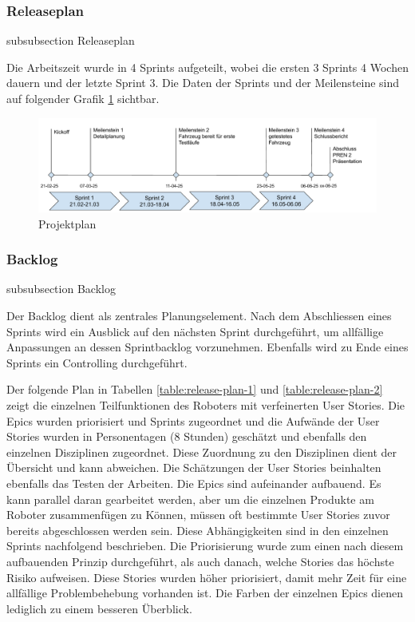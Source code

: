 \subsubsection*{Releaseplan}
    {subsubsection}
    {Releaseplan}

Die Arbeitszeit wurde in 4 Sprints aufgeteilt, wobei die ersten 3 Sprints 4 Wochen dauern und der letzte Sprint 3. Die Daten der Sprints und der Meilensteine sind auf folgender Grafik \ref{fig:project-plan} sichtbar.


\begin{figure}[H]
\centering
\includegraphics[width=\textwidth]{assets/projektmanagement/projektplan.pdf}
\caption{Projektplan}
\label{fig:project-plan}
\end{figure}

\subsubsection*{Backlog}
    {subsubsection}
    {Backlog}
    
Der Backlog dient als zentrales Planungselement.
Nach dem Abschliessen eines Sprints wird ein Ausblick auf den nächsten Sprint durchgeführt, um allfällige Anpassungen an dessen Sprintbacklog vorzunehmen. Ebenfalls wird zu Ende eines Sprints ein Controlling durchgeführt.

Der folgende Plan in Tabellen \ref{table:release-plan-1} und \ref{table:release-plan-2} zeigt die einzelnen Teilfunktionen des Roboters mit verfeinerten User Stories. Die Epics wurden priorisiert und Sprints zugeordnet und die Aufwände der User Stories wurden in Personentagen (8 Stunden) geschätzt und ebenfalls den einzelnen Disziplinen zugeordnet. Diese Zuordnung zu den Disziplinen dient der Übersicht und kann abweichen.
Die Schätzungen der User Stories beinhalten ebenfalls das Testen der Arbeiten. Die Epics sind aufeinander aufbauend. Es kann parallel daran gearbeitet werden, aber um die einzelnen Produkte am Roboter zusammenfügen zu Können, müssen oft bestimmte User Stories zuvor bereits abgeschlossen werden sein. Diese Abhängigkeiten sind in den einzelnen Sprints nachfolgend beschrieben. Die Priorisierung wurde zum einen nach diesem aufbauenden Prinzip durchgeführt, als auch danach, welche Stories das höchste Risiko aufweisen. Diese Stories wurden höher priorisiert, damit mehr Zeit für eine allfällige Problembehebung vorhanden ist.
Die Farben der einzelnen Epics dienen lediglich zu einem besseren Überblick.


